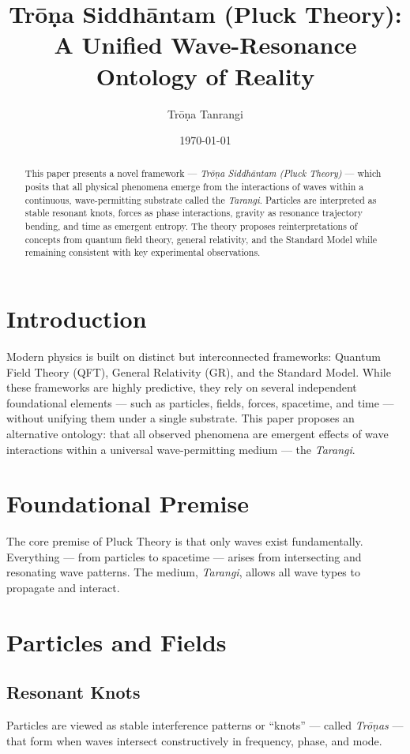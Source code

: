 \documentclass[12pt]{article}
\title{\textbf{Trōṇa Siddhāntam (Pluck Theory): A Unified Wave-Resonance Ontology of Reality}}
\author{Trōṇa Tanrangi}
\affil{Independent Researcher\\\texttt{tronatheory@gmail.com}}
\date{\today}
\begin{document}
\maketitle

\begin{abstract}
This paper presents a novel framework — \textit{Trōṇa Siddhāntam (Pluck Theory)} — which posits that all physical phenomena emerge from the interactions of waves within a continuous, wave-permitting substrate called the \textit{Tarangi}. Particles are interpreted as stable resonant knots, forces as phase interactions, gravity as resonance trajectory bending, and time as emergent entropy. The theory proposes reinterpretations of concepts from quantum field theory, general relativity, and the Standard Model while remaining consistent with key experimental observations. 
\end{abstract}

\section{Introduction}
Modern physics is built on distinct but interconnected frameworks: Quantum Field Theory (QFT), General Relativity (GR), and the Standard Model. While these frameworks are highly predictive, they rely on several independent foundational elements — such as particles, fields, forces, spacetime, and time — without unifying them under a single substrate. This paper proposes an alternative ontology: that all observed phenomena are emergent effects of wave interactions within a universal wave-permitting medium — the \textit{Tarangi}.

\section{Foundational Premise}
The core premise of Pluck Theory is that only waves exist fundamentally. Everything — from particles to spacetime — arises from intersecting and resonating wave patterns. The medium, \textit{Tarangi}, allows all wave types to propagate and interact.

\section{Particles and Fields}
\subsection{Resonant Knots}
Particles are viewed as stable interference patterns or “knots” — called \textit{Trōṇas} — that form when waves intersect constructively in frequency, phase, and mode.
\end{document}
